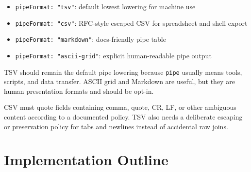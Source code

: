 \begin{itemize}
\tightlist
\item
  \texttt{p\allowbreak{}i\allowbreak{}p\allowbreak{}e\allowbreak{}F\allowbreak{}o\allowbreak{}r\allowbreak{}m\allowbreak{}a\allowbreak{}t\allowbreak{}:\allowbreak{} \allowbreak{}"\allowbreak{}t\allowbreak{}s\allowbreak{}v\allowbreak{}"}: default lowest lowering for machine use
\item
  \texttt{p\allowbreak{}i\allowbreak{}p\allowbreak{}e\allowbreak{}F\allowbreak{}o\allowbreak{}r\allowbreak{}m\allowbreak{}a\allowbreak{}t\allowbreak{}:\allowbreak{} \allowbreak{}"\allowbreak{}c\allowbreak{}s\allowbreak{}v\allowbreak{}"}: RFC-style escaped CSV for spreadsheet and shell export
\item
  \texttt{p\allowbreak{}i\allowbreak{}p\allowbreak{}e\allowbreak{}F\allowbreak{}o\allowbreak{}r\allowbreak{}m\allowbreak{}a\allowbreak{}t\allowbreak{}:\allowbreak{} \allowbreak{}"\allowbreak{}m\allowbreak{}a\allowbreak{}r\allowbreak{}k\allowbreak{}d\allowbreak{}o\allowbreak{}w\allowbreak{}n\allowbreak{}"}: docs-friendly pipe table
\item
  \texttt{p\allowbreak{}i\allowbreak{}p\allowbreak{}e\allowbreak{}F\allowbreak{}o\allowbreak{}r\allowbreak{}m\allowbreak{}a\allowbreak{}t\allowbreak{}:\allowbreak{} \allowbreak{}"\allowbreak{}a\allowbreak{}s\allowbreak{}c\allowbreak{}i\allowbreak{}i\allowbreak{}-\allowbreak{}g\allowbreak{}r\allowbreak{}i\allowbreak{}d\allowbreak{}"}: explicit human-readable pipe output
\end{itemize}

TSV should remain the default pipe lowering because \texttt{p\allowbreak{}i\allowbreak{}p\allowbreak{}e} usually means tools, scripts, and data transfer. ASCII grid and Markdown are useful, but they are human presentation formats and should be opt-in.

CSV must quote fields containing comma, quote, CR, LF, or other ambiguous content according to a documented policy. TSV also needs a deliberate escaping or preservation policy for tabs and newlines instead of accidental raw joins.

\section{Implementation Outline}\label{record-133-implementation-outline}

